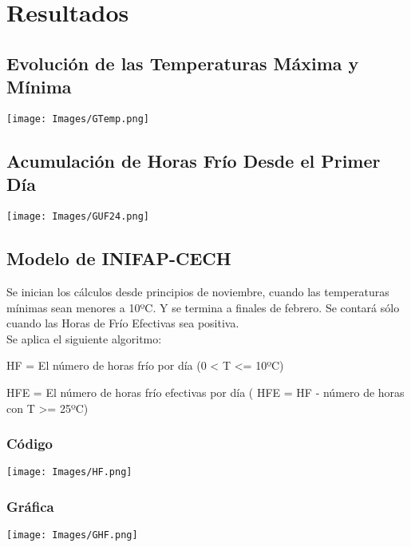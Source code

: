 \documentclass{article}
\begin{document}
\section{Resultados}

\subsection{Evolución de las Temperaturas Máxima y Mínima}

\begin{center}
    \texttt{[image: Images/GTemp.png]}
\end{center}

\subsection{Acumulación de Horas Frío Desde el Primer Día}

\begin{center}
    \texttt{[image: Images/GUF24.png]}
\end{center}

\subsection{Modelo de INIFAP-CECH}
\noindent Se inician los cálculos desde principios de noviembre, cuando las temperaturas mínimas sean menores a 10ºC. Y se termina a finales de febrero. Se contará sólo cuando las Horas de Frío Efectivas sea positiva. 
\\

Se aplica el siguiente algoritmo:

HF = El número de horas frío por día (0 < T <= 10ºC)

HFE = El número de horas frío efectivas por día ( HFE = HF - número de horas con T >= 25ºC)
\subsubsection{Código}

\begin{center}
    \texttt{[image: Images/HF.png]}
\end{center}

\subsubsection{Gráfica}
\begin{center}
    \texttt{[image: Images/GHF.png]}
\end{center}
\end{document}
